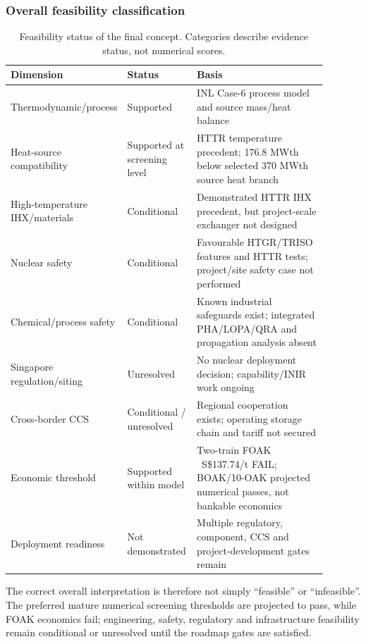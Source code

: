 \subsubsection{Overall feasibility classification}
\begin{table}[htbp]\centering\small
\caption{Feasibility status of the final concept. Categories describe evidence status, not numerical scores.}
\begin{tabular}{p{0.25\linewidth}p{0.22\linewidth}p{0.42\linewidth}}
\toprule Dimension & Status & Basis \\ \midrule
Thermodynamic/process & Supported & INL Case-6 process model and source mass/heat balance \\
Heat-source compatibility & Supported at screening level & HTTR temperature precedent; 176.8 MWth below selected 370 MWth source heat branch \\
High-temperature IHX/materials & Conditional & Demonstrated HTTR IHX precedent, but project-scale exchanger not designed \\
Nuclear safety & Conditional & Favourable HTGR/TRISO features and HTTR tests; project/site safety case not performed \\
Chemical/process safety & Conditional & Known industrial safeguards exist; integrated PHA/LOPA/QRA and propagation analysis absent \\
Singapore regulation/siting & Unresolved & No nuclear deployment decision; capability/INIR work ongoing \\
Cross-border CCS & Conditional / unresolved & Regional cooperation exists; operating storage chain and tariff not secured \\
Economic threshold & Supported within model & Two-train FOAK ~S\$137.74/t FAIL; BOAK/10-OAK projected numerical passes, not bankable economics \\
Deployment readiness & Not demonstrated & Multiple regulatory, component, CCS and project-development gates remain \\
\bottomrule\end{tabular}\end{table}

The correct overall interpretation is therefore not simply ``feasible'' or ``infeasible''. The preferred mature numerical screening thresholds are projected to pass, while FOAK economics fail; engineering, safety, regulatory and infrastructure feasibility remain conditional or unresolved until the roadmap gates are satisfied.
